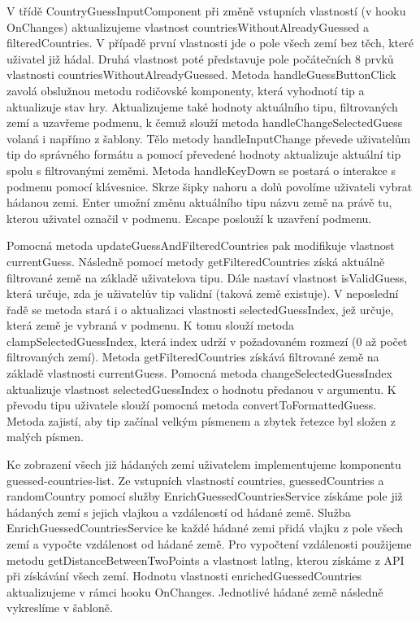 V třídě CountryGuessInputComponent při změně vstupních vlastností (v hooku OnChanges) aktualizujeme vlastnost countriesWithoutAlreadyGuessed a filteredCountries. 
V případě první vlastnosti jde o pole všech zemí bez těch, které uživatel již hádal. Druhá vlastnost poté představuje pole počátečních 8 prvků vlastnosti countriesWithoutAlreadyGuessed. 
Metoda handleGuessButtonClick zavolá obslužnou metodu rodičovské komponenty, která vyhodnotí tip a aktualizuje stav hry. 
Aktualizujeme také hodnoty aktuálního tipu, filtrovaných zemí a uzavřeme podmenu, k čemuž slouží metoda handleChangeSelectedGuess volaná i napřímo z šablony. 
Tělo metody handleInputChange převede uživatelům tip do správného formátu a pomocí převedené hodnoty aktualizuje aktuální tip spolu s filtrovanými zeměmi.
Metoda handleKeyDown se postará o interakce s podmenu pomocí klávesnice. Skrze šipky nahoru a dolů povolíme uživateli vybrat hádanou zemi. 
Enter umožní změnu aktuálního tipu názvu země na právě tu, kterou uživatel označil v podmenu. Escape poslouží k uzavření podmenu.

Pomocná metoda updateGuessAndFilteredCountries pak modifikuje vlastnost currentGuess. 
Následně pomocí metody getFilteredCountries získá aktuálně filtrované země na základě uživatelova tipu. 
Dále nastaví vlastnost isValidGuess, která určuje, zda je uživatelův tip validní (taková země existuje). 
V neposlední řadě se metoda stará i o aktualizaci vlastnosti selectedGuessIndex, jež určuje, která země je vybraná v podmenu. 
K tomu slouží metoda clampSelectedGuessIndex, která index udrží v požadovaném rozmezí (0 až počet filtrovaných zemí).
Metoda getFilteredCountries získává filtrované země na základě vlastnosti currentGuess. 
Pomocná metoda changeSelectedGuessIndex aktualizuje vlastnost selectedGuessIndex o hodnotu předanou v argumentu. 
K převodu tipu uživatele slouží pomocná metoda convertToFormattedGuess. Metoda zajistí, aby tip začínal velkým písmenem a zbytek řetezce byl složen z malých písmen.

Ke zobrazení všech již hádaných zemí uživatelem implementujeme komponentu guessed-countries-list. 
Ze vstupních vlastností countries, guessedCountries a randomCountry pomocí služby EnrichGuessedCountriesService získáme pole již hádaných zemí s jejich vlajkou a vzdáleností od hádané země.
Služba EnrichGuessedCountriesService ke každé hádané zemi přidá vlajku z pole všech zemí a vypočte vzdálenost od hádané země. 
Pro vypočtení vzdálenosti použijeme metodu getDistanceBetweenTwoPoints a vlastnost latlng, kterou získáme z API při získávání všech zemí.
Hodnotu vlastnosti enrichedGuessedCountries aktualizujeme v rámci hooku OnChanges. Jednotlivé hádané země následně vykreslíme v šabloně.


